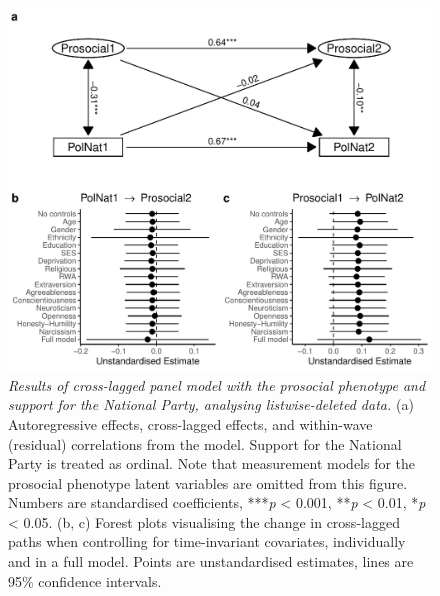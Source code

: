 \documentclass[
  man,floatsintext]{apa6}
\begin{document}
\begin{figure}
\centering
\includegraphics{manuscript_files/figure-latex/clpmPlotPolNatdReduced-1.pdf}
\caption{\label{fig:clpmPlotPolNatdReduced}\emph{Results of cross-lagged panel model with
the prosocial phenotype and support for the National Party, analysing
listwise-deleted data.} (a) Autoregressive effects, cross-lagged effects, and
within-wave (residual) correlations from the model. Support for the National
Party is treated as ordinal. Note that measurement models for the prosocial
phenotype latent variables are omitted from this figure. Numbers are
standardised coefficients, ***\emph{p} \textless{} 0.001, **\emph{p} \textless{} 0.01, *\emph{p} \textless{} 0.05.
(b, c) Forest plots visualising the change in cross-lagged paths when
controlling for time-invariant covariates, individually and in a full model.
Points are unstandardised estimates, lines are 95\% confidence intervals.}
\end{figure}

\newpage
\end{document}
